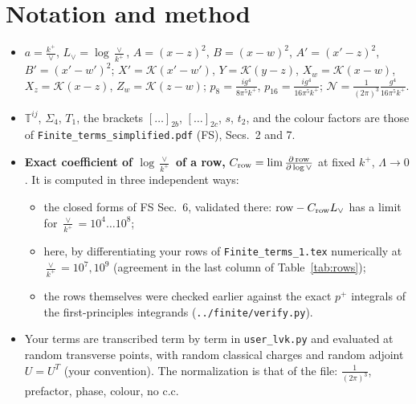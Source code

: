 \documentclass[10pt]{article}
\numberwithin{equation}{section}
\newcommand{\Lv}{L_{\vee}}
\newcommand{\KK}{\mathcal K}
\newcommand{\NN}{\mathcal N}
\newcommand{\pre}{\frac{1}{(2\pi)^3}}
\begin{document}
\section{Notation and method}\label{sec:method}
\begin{itemize}
\item $a=\frac{k^+}{\vee}$, $\Lv=\log\frac{\vee}{k^+}$, $A=(x-z)^2$, $B=(x-w)^2$, $A'=(x'-z)^2$, $B'=(x'-w')^2$; $X'=\KK(x'-w')$, $Y=\KK(y-z)$, $X_w=\KK(x-w)$, $X_z=\KK(x-z)$, $Z_w=\KK(z-w)$; $p_8=\frac{ig^4}{8\pi^5k^+}$, $p_{16}=\frac{ig^4}{16\pi^5k^+}$; $\NN=\pre\frac{g^4}{16\pi^5k^+}$.
\item $\mathbb T^{ij}$, $\Sigma_4$, $T_1$, the brackets $[\dots]_{2b}$, $[\dots]_{2c}$, $s$, $t_2$, and the colour factors are those of \texttt{Finite\_terms\_simplified.pdf} (FS), Secs.~2 and 7.
\item \textbf{Exact coefficient of $\log\frac{\vee}{k^+}$ of a row,} $C_{\rm row}=\lim\frac{\partial\,{\rm row}}{\partial\log\vee}$ at fixed $k^+$, $\Lambda\to0$. It is computed in three independent ways:
\begin{itemize}
\item the closed forms of FS Sec.~6, validated there: ${\rm row}-C_{\rm row}\Lv$ has a limit for $\frac{\vee}{k^+}=10^4\dots10^8$;
\item here, by differentiating your rows of \texttt{Finite\_terms\_1.tex} numerically at $\frac{\vee}{k^+}=10^7,10^9$ (agreement in the last column of Table~\ref{tab:rows});
\item the rows themselves were checked earlier against the exact $p^+$ integrals of the first-principles integrands (\texttt{../finite/verify.py}).
\end{itemize}
\item Your terms are transcribed term by term in \texttt{user\_lvk.py} and evaluated at random transverse points, with random classical charges and random adjoint $U=U^T$ (your convention). The normalization is that of the file: $\pre$, prefactor, phase, colour, no c.c.
\end{itemize}

\end{document}
